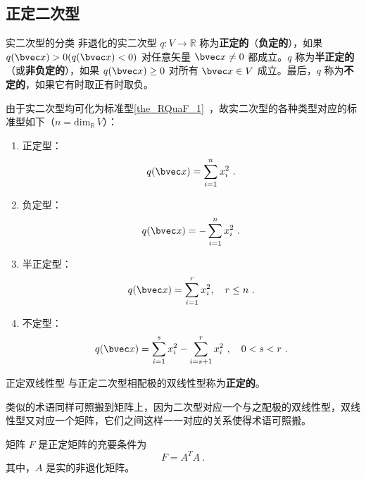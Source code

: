 
\begin{issues}
\end{issues}

\subsection{正定二次型}
\begin{definition}{实二次型的分类}
非退化的实二次型 $q:V\rightarrow\mathbb R$ 称为\textbf{正定的}（\textbf{负定的}），如果 $q(\bvec x)>0(q(\bvec x)<0)$ 对任意矢量 $\bvec x\neq0$ 都成立。$q$ 称为\textbf{半正定的}（或\textbf{非负定的}），如果 $q(\bvec x)\geq0$ 对所有 $\bvec x\in V$ 成立。最后，$q$ 称为\textbf{不定的}，如果它有时取正有时取负。
\end{definition}
由于实二次型均可化为标准型\autoref{the_RQuaF_1}~，故实二次型的各种类型对应的标准型如下（$n=\mathrm{dim}_\mathbb R \,V$）：
\begin{enumerate}
\item 正定型：\begin{equation}\label{eq_DeQua_1}
q(\bvec x)=\sum_{i=1}^n x_i^2~.
\end{equation}
\item 负定型：\begin{equation}
q(\bvec x)=-\sum_{i=1}^n x_i^2~.
\end{equation}
\item 半正定型：\begin{equation}
q(\bvec x)=\sum_{i=1}^r x_i^2,\quad r\leq n~.
\end{equation}
\item 不定型：\begin{equation}
q(\bvec x)=\sum_{i=1}^s x_i^2-\sum_{i=s+1}^r x_i^2~,\quad0<s< r~.
\end{equation}
\end{enumerate}
\begin{definition}{正定双线性型}\label{def_DeQua_1}
与正定二次型相配极的双线性型称为\textbf{正定的}。
\end{definition}
类似的术语同样可照搬到矩阵上，因为二次型对应一个与之配极的双线性型，双线性型又对应一个矩阵，它们之间这样一一对应的关系使得术语可照搬。
\begin{theorem}{}
矩阵 $F$ 是正定矩阵的充要条件为
\begin{equation}
F=A^TA~.
\end{equation}
其中，$A$ 是实的非退化矩阵。
\end{theorem}
